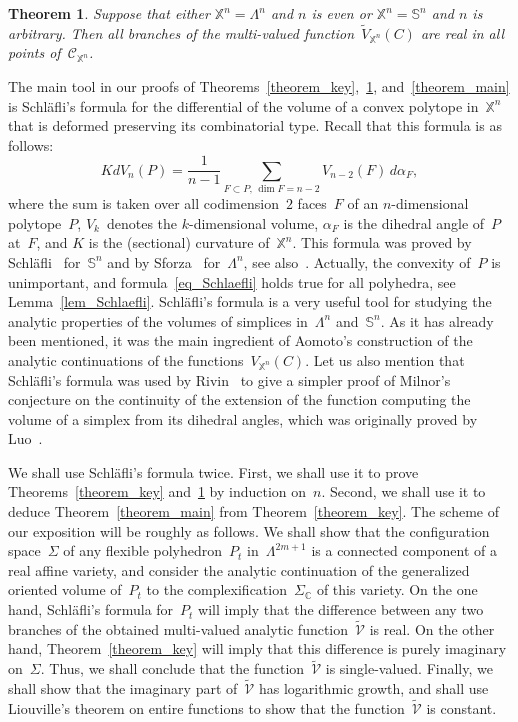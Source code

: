 \documentclass[reqno,tbtags,12pt]{amsart}
\numberwithin{equation}{section}
\newcommand{\CC}{\mathcal{C}}
\newcommand{\C}{\mathbb{C}}
\newcommand{\X}{\mathbb{X}}
\newcommand{\bS}{\mathbb{S}}
\newcommand{\tCV}{\widetilde{\mathcal{V}}}
\newcommand{\tV}{\widetilde{V}}
\newtheorem{theorem}{Theorem}[section]
\theoremstyle{definition}
\begin{document}
\begin{theorem}\label{theorem_key2}
Suppose that either\/ $\X^n=\Lambda^n$ and\/ $n$ is even or\/ $\X^n=\bS^n$ and\/ $n$ is arbitrary. Then all branches of the multi-valued function\/~$\tV_{\X^n}(C)$ are real in all points of\/~$\CC_{\X^n}$.
\end{theorem}

The main tool in our proofs of Theorems~\ref{theorem_key},~\ref{theorem_key2}, and~\ref{theorem_main} is Schl\"afli's formula for the differential of the volume of a convex polytope in~$\X^n$  that is deformed preserving its combinatorial type. Recall that this formula is as follows:
\begin{equation}\label{eq_Schlaefli}
KdV_n(P)=\frac{1}{n-1}\sum_{F\subset P,\,\dim F=n-2}V_{n-2}(F)\,d\alpha_F,
\end{equation}
where the sum is taken over all codimension~$2$ faces~$F$ of an $n$-dimensional polytope~$P$, $V_k$~denotes the $k$-dimensional volume, $\alpha_F$ is the dihedral angle of~$P$ at~$F$, and $K$ is the (sectional) curvature of~$\X^n$. This formula was proved by Schl\"afli~\cite{Sch58} for~$\bS^n$ and by Sforza~\cite{Sfo07} for~$\Lambda^n$, see also~\cite[Ch. 7, Sect.~2.2]{AVS88}. Actually, the convexity of~$P$ is unimportant, and formula~\eqref{eq_Schlaefli} holds true for all polyhedra, see Lemma~\ref{lem_Schlaefli}. Schl\"afli's formula is a very useful tool for studying the analytic properties of the volumes of simplices in~$\Lambda^n$ and~$\bS^n$. As it has already been mentioned, it was the main ingredient of Aomoto's construction of the analytic continuations of the functions~$V_{\X^n}(C)$. Let us also mention that Schl\"afli's formula was used by Rivin~\cite{Riv08} to give a simpler proof of  Milnor's conjecture on the continuity of the extension of the  function  computing the volume of a simplex from its dihedral angles, which was originally proved by Luo~\cite{Luo06}.

We shall use Schl\"afli's formula twice. First, we shall use it to prove Theorems~\ref{theorem_key} and~\ref{theorem_key2} by induction on~$n$. Second, we shall use it to deduce Theorem~\ref{theorem_main} from Theorem~\ref{theorem_key}. The scheme of our exposition will be roughly as follows. We shall show that the configuration space~$\Sigma$ of any flexible polyhedron~$P_t$ in~$\Lambda^{2m+1}$ is a connected component of a real affine variety, and  consider the analytic continuation of the generalized oriented volume of~$P_t$ to the complexification~$\Sigma_{\C}$ of this variety. On the one hand, Schl\"afli's formula for~$P_t$ will imply that the difference between any two branches of the obtained multi-valued analytic function~$\tCV$ is real. On the other hand, Theorem~\ref{theorem_key} will imply that this difference is purely imaginary on~$\Sigma$. Thus, we shall conclude that the function~$\tCV$ is single-valued. Finally, we shall show that the imaginary part of~$\tCV$ has logarithmic growth, and shall use Liouville's  theorem on entire functions to show that the function~$\tCV$  is constant.  
\end{document}
